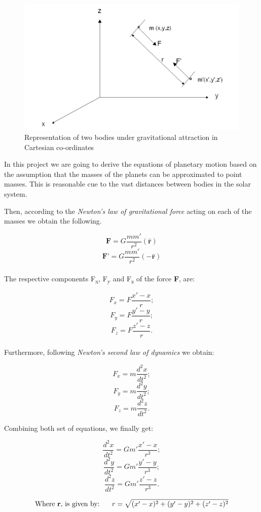 \documentclass[a4paper]{article}
\begin{document}
\begin{figure}[H]
\centering
\includegraphics[width=.9\textwidth]{cs.png}
\caption{Representation of two bodies under gravitational attraction in Cartesian co-ordinates}
\label{fig:cs}
\end{figure}


In this project we are going to derive the equations of planetary motion based on the assumption that the masses of the planets can be approximated to point masses. This is reasonable cue to the vast distances between bodies in the solar system.

Then, according to the \textit{Newton's law of gravitational force} acting on each of the masses we obtain the following. 

\[\textbf{F} = G\frac{mm'}{r^2}({\hat{\textbf{r}}})\]
\[\textbf{F'} = G\frac{mm'}{r^2}({-\hat{\textbf{r}}})\]
\\
The respective components F\textsubscript{x}, F\textsubscript{y} and F\textsubscript{z}  of the force \textbf{F}, are: 


\[ F_x = F\frac{x'-x}{r}; \] 
\[ F_y = F\frac{y'-y}{r}; \] 
\[ F_z = F\frac{z'-z}{r}. \]
\\
Furthermore, following \textit{Newton’s second law of dynamics} we obtain:

\[ F_x = m\frac{d^2 x}{dt^2}; \]
\[ F_y = m\frac{d^2 y}{dt^2}; \]
\[ F_z = m\frac{d^2 z}{dt^2}.  \]

\pagebreak

Combining both set of equations, we finally get:

\[ \frac{d^2 x}{dt^2} = Gm'\frac{x'-x}{r^3}; \]
\[ \frac{d^2 y}{dt^2} = Gm'\frac{y'-y}{r^3}; \]
\[ \frac{d^2 z}{dt^2} = Gm'\frac{z'-z}{r^3}. \]

\begin{equation}
\text{Where \textbf{r}, is given by: \space\space\space} r = \sqrt{(x'-x)^2+(y'-y)^2+(z'-z)^2}
\end{equation}
\end{document}
